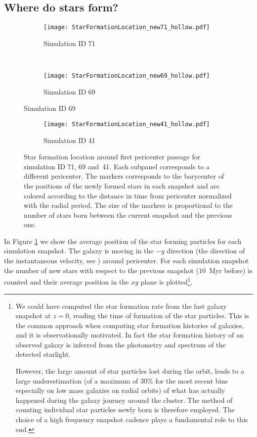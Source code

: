 

\subsection{Where do stars form?}
\begin{figure}
\centering
\begin{subfigure}[t]{0.83\textwidth}
\centering
\caption{Simulation ID 71}
\texttt{[image: StarFormationLocation\_new71\_hollow.pdf]}
\end{subfigure}\\%
\begin{subfigure}[t]{0.83\textwidth}
\centering
\caption{Simulation ID 69}
\texttt{[image: StarFormationLocation\_new69\_hollow.pdf]}
\end{subfigure}
\label{fig:sf_location}
\end{figure}
\begin{figure}[ht]
\centering
\ContinuedFloat %
\begin{subfigure}{0.83\textwidth}
\caption{Simulation ID 41}
\texttt{[image: StarFormationLocation\_new41\_hollow.pdf]}
\end{subfigure}
\caption{Star formation location around first pericenter passage for simulation ID 71, 69 and~41.
Each subpanel corresponds to a different pericenter.
The markers corresponds to the barycenter of the positions of the newly formed stars in each snapshot and are colored according to the distance in time from pericenter normalized with the radial period.
The size of the markers is proportional to the number of stars born between the current snapshot and the previous one.}
\end{figure}
In Figure \ref{fig:sf_location} we show the average position of the star forming particles for each simulation snapshot.
The galaxy is moving in the $-y$ direction (the direction of the instantaneous velocity, see ) around pericenter.
For each simulation snapshot the number of new stars with respect to the previous snapshot ($10$~Myr before) is counted and their average position in the $xy$ plane is plotted\footnote{
We could have computed the star formation rate from the last galaxy snapshot at $z=0$, reading the time of formation of the star particles.
This is the common approach %
when computing star formation histories of galaxies, and it is observationally motivated.
In fact the star formation history of an observed galaxy is inferred from the photometry and spectrum of the detected starlight.

However, the large amount of star particles lost during the orbit, leads to a large underestimation (of a maximum of 30\% for the most recent bins especially on low mass galaxies on radial orbits) of what has actually happened during the galaxy journey around the cluster.
The method of counting individual star particles newly born is therefore employed.
The choice of a high frequency snapshot cadence plays a fundamental role to this end.
}.
